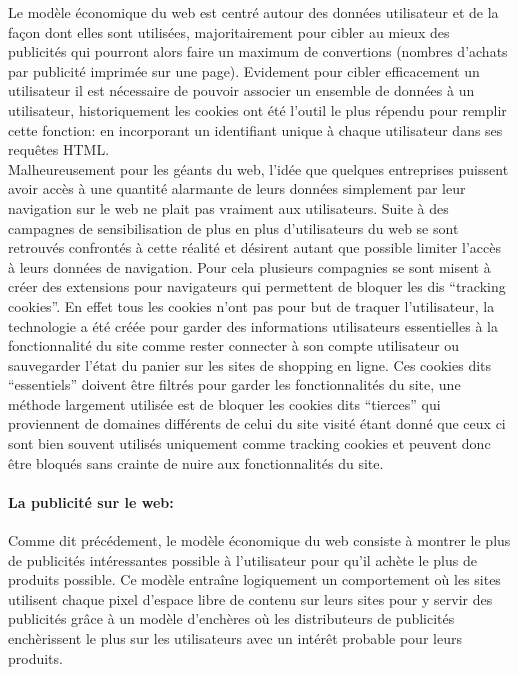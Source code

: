 \documentclass[oneside,a4paper,12pt]{article}
\begin{document}
Le modèle économique du web est centré autour des données utilisateur et de la façon dont elles sont utilisées, majoritairement pour cibler au mieux des publicités qui pourront alors faire un maximum de convertions (nombres d'achats par publicité imprimée sur une page). Evidement pour cibler efficacement un utilisateur il est nécessaire de pouvoir associer un ensemble de données à un utilisateur, historiquement les cookies ont été l'outil le plus répendu pour remplir cette fonction: en incorporant un identifiant unique à chaque utilisateur dans ses requêtes HTML.\\

Malheureusement pour les géants du web, l'idée que quelques entreprises puissent avoir accès à une quantité alarmante de leurs données simplement par leur navigation sur le web ne plait pas vraiment aux utilisateurs. Suite à des campagnes de sensibilisation de plus en plus d'utilisateurs du web se sont retrouvés confrontés à cette réalité et désirent autant que possible limiter l'accès à leurs données de navigation. Pour cela plusieurs compagnies se sont misent à créer des extensions pour navigateurs qui permettent de bloquer les dis ``tracking cookies''. En effet tous les cookies n'ont pas pour but de traquer l'utilisateur, la technologie a été créée pour garder des informations utilisateurs essentielles à la fonctionnalité du site comme rester connecter à son compte utilisateur ou sauvegarder l'état du panier sur les sites de shopping en ligne. Ces cookies dits ``essentiels'' doivent être filtrés pour garder les fonctionnalités du site, une méthode largement utilisée est de bloquer les cookies dits ``tierces'' qui proviennent de domaines différents de celui du site visité étant donné que ceux ci sont bien souvent utilisés uniquement comme tracking cookies et peuvent donc être bloqués sans crainte de nuire aux fonctionnalités du site.

\paragraph*{La publicité sur le web:}

Comme dit précédement, le modèle économique du web consiste à montrer le plus de publicités intéressantes possible à l'utilisateur pour qu'il achète le plus de produits possible. Ce modèle entraîne logiquement un comportement où les sites utilisent chaque pixel d'espace libre de contenu sur leurs sites pour y servir des publicités grâce à un modèle d'enchères où les distributeurs de publicités enchèrissent le plus sur les utilisateurs avec un intérêt probable pour leurs produits.
\end{document}
